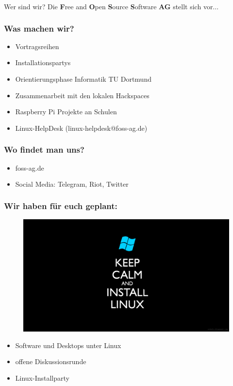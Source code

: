 \begin{frame}{Wer sind wir?}
	Die \textbf{F}ree and \textbf{O}pen \textbf{S}ource \textbf{S}oftware \textbf{AG} stellt sich vor... 
\end{frame}

\begin{frame}
\frametitle{Was machen wir?}
\begin{itemize}
	\item Vortragsreihen
	\item Installationspartys
	\item Orientierungsphase Informatik TU Dortmund
	\item Zusammenarbeit mit den lokalen Hackspaces
	\item Raspberry Pi Projekte an Schulen
	\item Linux-HelpDesk (linux-helpdesk@foss-ag.de)
\end{itemize}
\end{frame}

\begin{frame}
	\frametitle{Wo findet man uns?}
	\begin{itemize}
		\item foss-ag.de
		\item Social Media: Telegram, Riot, Twitter
	\end{itemize}
\end{frame}

\begin{frame}
\frametitle{Wir haben für euch geplant:}
\begin{figure}
\includegraphics[scale=0.15]{resources/linuxcalm.png}
\end{figure}
	\begin{itemize}
		\item Software und Desktops unter Linux
		\item offene Diskussionsrunde
		\item Linux-Installparty
	\end{itemize}
\end{frame}


